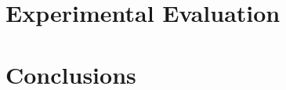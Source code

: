 \documentclass[times,9pt,article]{llncs}
\begin{document}
\section{Experimental Evaluation}


\section{Conclusions}
\end{document}
